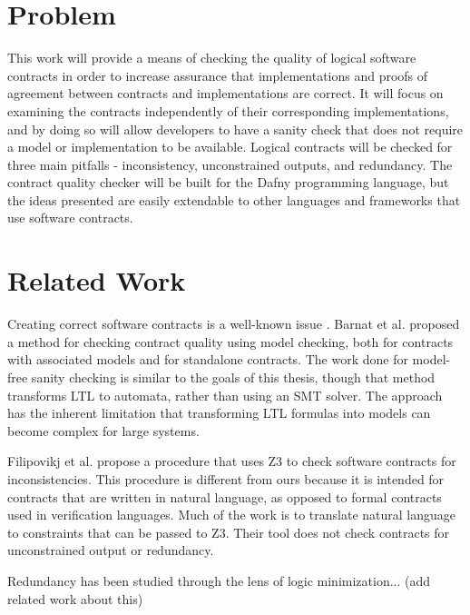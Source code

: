\documentclass{article}
\newif\ifcomments
\newcommand{\egm}[1]{\ifcomments\textcolor{orange}{egm: #1}\fi}
\begin{document}
\section{Problem}

This work will provide a means of checking the quality of logical software contracts in order to increase assurance
that implementations and proofs of agreement between contracts and implementations are correct. It will focus on
examining the contracts independently of their corresponding implementations, and by doing so will allow developers
to have a sanity check that does not require a model or implementation to be available. Logical contracts will be
checked for three main pitfalls - inconsistency, unconstrained outputs, and redundancy. The contract quality checker
will be built for the Dafny programming language, but the ideas presented are easily extendable to other languages
and frameworks that use software contracts.
\egm{Other frameworks and languages should be a part of the related work. These may also be mentioned in the introduction.}

\section{Related Work}

Creating correct software contracts is a well-known issue \cite{rozier2016specification} \cite{kupferman2006sanity}.
Barnat et al. \cite{barnat2012checking} \cite{barnat2016analysing} proposed a method for checking contract quality using model checking,
both for contracts with associated models and for standalone contracts. The work done for model-free sanity checking is
similar to the goals of this thesis, though that method transforms LTL to automata, rather than using an SMT solver. The approach
has the inherent limitation that transforming LTL formulas into models can become complex for large systems.

Filipovikj et al. \cite{filipovikj2017smt} propose a procedure that uses Z3 \cite{de2008z3} to check software contracts
for inconsistencies. This procedure is different from ours because it is intended for contracts that are written in
natural language, as opposed to formal contracts used in verification languages. Much of the work is to translate
natural language to constraints that can be passed to Z3. Their tool does not check contracts
for unconstrained output or redundancy. 

Redundancy has been studied through the lens of logic minimization... (add related work about this)
\egm{The notion of redundancy is actually really interesting. I wonder if it might be wise to read some of the related work is logic minimization? That is used a bunch in hardware design to simplify complex predicates. Binary decision diagrams were used extensively to minimize logic for sometime. Anyways, logic minimization may be just what is needed for redundancy, and it would be some more related work.}
\end{document}
